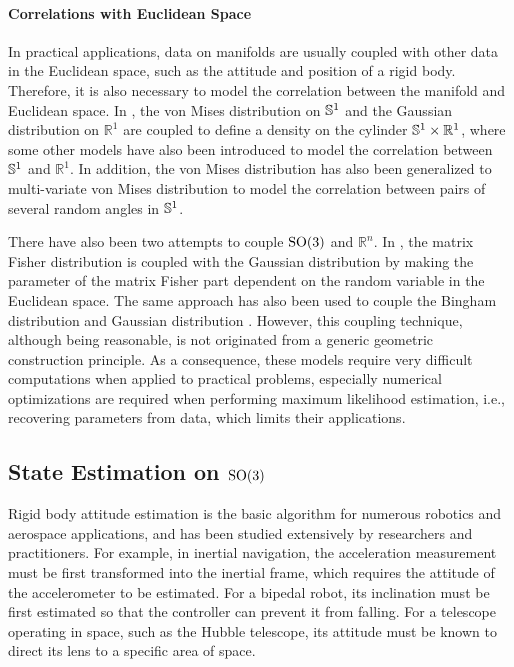 \paragraph{Correlations with Euclidean Space}

In practical applications, data on manifolds are usually coupled with other data in the Euclidean space, such as the attitude and position of a rigid body.
Therefore, it is also necessary to model the correlation between the manifold and Euclidean space.
In \cite{mardia1978model}, the von Mises distribution on $\mathbb{S}^1$ and the Gaussian distribution on $\mathbb{R}^1$ are coupled to define a density on the cylinder $\mathbb{S}^1 \times \mathbb{R}^1$, where some other models \cite{abe2017tractable,johnson1978some,kato2008dependent} have also been introduced to model the correlation between $\mathbb{S}^1$ and $\mathbb{R}^1$.
In addition, the von Mises distribution has also been generalized to multi-variate von Mises distribution \cite{mardia2008multivariate} to model the correlation between pairs of several random angles in $\mathbb{S}^1$.

There have also been two attempts to couple $\mathrm{SO}(3)$ and $\mathbb{R}^n$.
In \cite{markley2006attitude}, the matrix Fisher distribution is coupled with the Gaussian distribution by making the parameter of the matrix Fisher part dependent on the random variable in the Euclidean space.
The same approach has also been used to couple the Bingham distribution and Gaussian distribution \cite{darling2016uncertainty}.
However, this coupling technique, although being reasonable, is not originated from a generic geometric construction principle.
As a consequence, these models require very difficult computations when applied to practical problems, especially numerical optimizations are required when performing maximum likelihood estimation, i.e., recovering parameters from data, which limits their applications.

\subsection{State Estimation on $\mathrm{SO}(3)$} \label{section:intro-review-estimation}

Rigid body attitude estimation is the basic algorithm for numerous robotics and aerospace applications, and has been studied extensively by researchers and practitioners.
For example, in inertial navigation, the acceleration measurement must be first transformed into the inertial frame, which requires the attitude of the accelerometer to be estimated.
For a bipedal robot, its inclination must be first estimated so that the controller can prevent it from falling.
For a telescope operating in space, such as the Hubble telescope, its attitude must be known to direct its lens to a specific area of space.

